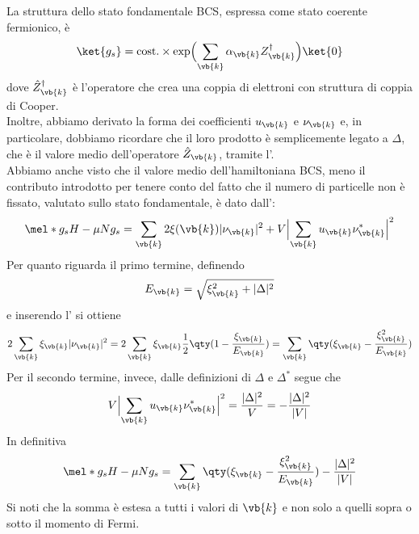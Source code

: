 La struttura dello stato fondamentale BCS, espressa come stato coerente fermionico, è
\begin{equation*}
   \ket{g_s}
   =\text{cost.} \times \exp \Bigl( \sum_{\vb{k}} \alpha_{\vb{k}} Z^\dagger_{\vb{k}} \Bigr) \ket{0}
\end{equation*}
dove $\hat{Z}^{\dag}_{\vb{k}}$ è l'operatore che crea una coppia di elettroni con struttura di coppia di Cooper.\\
Inoltre, abbiamo derivato la forma dei coefficienti $u_{\vb{k}}$ e $\nu_{\vb{k}}$ e, in particolare, dobbiamo ricordare che il loro prodotto è semplicemente legato a $\Delta$, che è il valore medio dell'operatore $\hat{Z}_{\vb{k}}$, tramite l'.\\
Abbiamo anche visto che il valore medio dell'hamiltoniana BCS, meno il contributo introdotto per tenere conto del fatto che il numero di particelle non è fissato, valutato sullo stato fondamentale, è dato dall':
\begin{equation*}
   \mel*{g_s}{H - \mu N}{g_s}=\sum_{\vb{k}} 2 \xi(\vb{k}) |\nu_{\vb{k}}|^2 + V \Bigl| \sum_{\vb{k}} u_{\vb{k}} \nu^*_{\vb{k}} \Bigr|^2
\end{equation*}
Per quanto riguarda il primo termine, definendo
\begin{equation*}
   E_{\vb{k}}=\sqrt{\xi^2_{\vb{k}} + |\Delta|^2}
\end{equation*}
e inserendo l' si ottiene
\begin{equation*}
   2 \sum_{\vb{k}} \xi_{\vb{k}} |\nu_{\vb{k}}|^2
   = 2 \sum_{\vb{k}} \xi_{\vb{k}} \frac{1}{2} \qty( 1 - \frac{\xi_{\vb{k}}}{E_{\vb{k}}} )
   = \sum_{\vb{k}} \qty( \xi_{\vb{k}} - \frac{\xi^2_{\vb{k}}}{E_{\vb{k}}} )
\end{equation*}
Per il secondo termine, invece, dalle definizioni di $\Delta$ e $\Delta^*$ segue che
\begin{equation*}
   V \Bigl| \sum_{\vb{k}} u_{\vb{k}} \nu^*_{\vb{k}} \Bigr|^2
   =\frac{|\Delta|^2}{V}
   =-\frac{|\Delta|^2}{|V|}
\end{equation*}
In definitiva
\begin{equation}
   \mel*{g_s}{H - \mu N}{g_s}
   = \sum_{\vb{k}} \qty( \xi_{\vb{k}} - \frac{\xi^2_{\vb{k}}}{E_{\vb{k}}} ) - \frac{|\Delta|^2}{|V|}
   \label{eq:BCS_energy_final_expression}
\end{equation}
Si noti che la somma è estesa a tutti i valori di $\vb{k}$ e non solo a quelli sopra o sotto il momento di Fermi.\\
